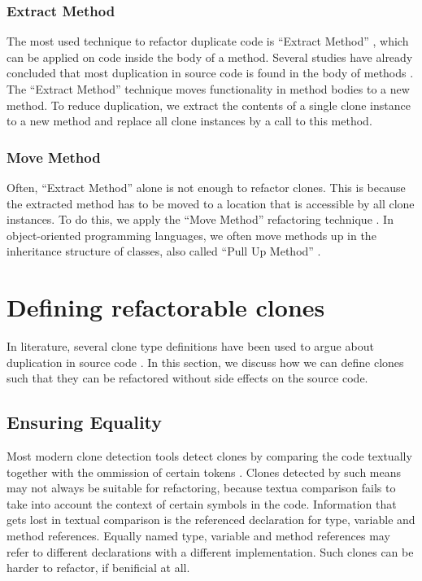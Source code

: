 \documentclass[conference]{IEEEtran}
\begin{document}
\subsubsection{Extract Method}
The most used technique to refactor duplicate code is ``Extract Method'' \cite{fowler2018refactoring}, which can be applied on code inside the body of a method. Several studies have already concluded that most duplication in source code is found in the body of methods \cite{lozano2007evaluating, white2016deep, bergman2004ethnographic}. The ``Extract Method'' technique moves functionality in method bodies to a new method. To reduce duplication, we extract the contents of a single clone instance to a new method and replace all clone instances by a call to this method.

\subsubsection{Move Method}
Often, ``Extract Method'' alone is not enough to refactor clones. This is because the extracted method has to be moved to a location that is accessible by all clone instances. To do this, we apply the ``Move Method'' refactoring technique \cite{fowler2018refactoring}. In object-oriented programming languages, we often move methods up in the inheritance structure of classes, also called ``Pull Up Method'' \cite{fowler2018refactoring}.

\section{Defining refactorable clones}
In literature, several clone type definitions have been used to argue about duplication in source code \cite{roy2007survey}. In this section, we discuss how we can define clones such that they can be refactored without side effects on the source code.

\subsection{Ensuring Equality}
Most modern clone detection tools detect clones by comparing the code textually together with the ommission of certain tokens \cite{roy2009comparison, svajlenko2014evaluating}. Clones detected by such means may not always be suitable for refactoring, because textua comparison fails to take into account the context of certain symbols in the code. Information that gets lost in textual comparison is the referenced declaration for type, variable and method references. Equally named type, variable and method references may refer to different declarations with a different implementation. Such clones can be harder to refactor, if benificial at all.
\end{document}
